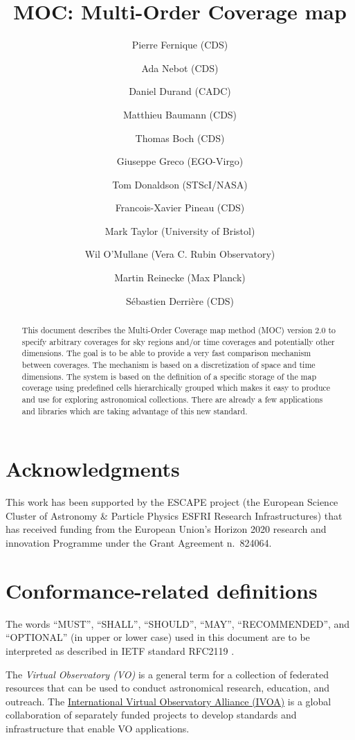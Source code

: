 \documentclass[11pt,a4paper]{ivoa}
\title{MOC: Multi-Order Coverage map}
\author[http://www.ivoa.net/twiki/bin/view/IVOA/PierreFernique]{Pierre Fernique (CDS)}
\author[http://www.ivoa.net/twiki/bin/view/IVOA/AdaNebot]{Ada Nebot (CDS)}
\author[http://www.ivoa.net/twiki/bin/view/IVOA/DanielDurand]{Daniel Durand (CADC)} \author{Matthieu Baumann (CDS)}
\author[http://www.ivoa.net/twiki/bin/view/IVOA/ThomasBoch]{Thomas Boch (CDS)} \author{Giuseppe Greco (EGO-Virgo)}
\author[http://www.ivoa.net/twiki/bin/view/IVOA/TomDonaldson]{Tom Donaldson (STScI/NASA)}
\author{Francois-Xavier Pineau (CDS)}
\author[http://www.ivoa.net/twiki/bin/view/IVOA/MarkTaylor]{Mark Taylor (University of Bristol)}
\author{Wil O'Mullane (Vera C. Rubin Observatory)}
\author{Martin Reinecke (Max Planck)}
\author{Sébastien Derrière (CDS)}
\begin{document}
\begin{abstract}
This document describes the Multi-Order Coverage map method (MOC)
version 2.0 to specify arbitrary coverages for sky regions and/or time
coverages and potentially other dimensions. The goal is to be able to
provide a very fast comparison mechanism between coverages. The
mechanism is based on a discretization of space and time
dimensions. The system is based on the definition of a specific storage
of the map coverage using predefined cells hierarchically grouped
which makes it easy to produce and use for exploring astronomical
collections. There are already a few applications and libraries which
are taking advantage of this new standard. 
\end{abstract}

\listoffigures
\listoftables  


\section*{Acknowledgments}
This work has been supported by the ESCAPE project (the European
Science Cluster of Astronomy \& Particle Physics ESFRI Research
Infrastructures) that has received funding from the European Union's
Horizon 2020 research and innovation Programme under the Grant
Agreement n.\ 824064.

\section*{Conformance-related definitions}
The words ``MUST'', ``SHALL'', ``SHOULD'', ``MAY'', ``RECOMMENDED'',
and ``OPTIONAL'' (in upper or lower case) used in this document are to
be interpreted as described in IETF standard RFC2119
\citep{std:RFC2119}.

The \emph{Virtual Observatory (VO)} is a general term for a collection
of federated resources that can be used to conduct astronomical
research, education, and outreach.  The
\href{http://www.ivoa.net}{International Virtual Observatory Alliance
  (IVOA)} is a global collaboration of separately funded projects to
develop standards and infrastructure that enable VO applications.
\end{document}
